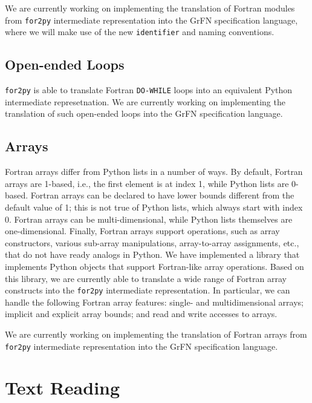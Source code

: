 \documentclass[article, 12pt, oneside]{memoir}
\begin{document}
We are currently working on implementing the translation of Fortran
modules from \texttt{for2py} intermediate representation into the GrFN
specification language, where we will make use of the new
\texttt{identifier} and naming conventions.

\hypertarget{open-ended-loops}{%
\subsection{Open-ended Loops}\label{open-ended-loops}}

\texttt{for2py} is able to translate Fortran \texttt{DO-WHILE} loops
into an equivalent Python intermediate represetnation. We are currently
working on implementing the translation of such open-ended loops into
the GrFN specification language.

\hypertarget{arrays}{%
\subsection{Arrays}\label{arrays}}

Fortran arrays differ from Python lists in a number of ways. By default,
Fortran arrays are 1-based, i.e., the first element is at index 1, while
Python lists are 0-based. Fortran arrays can be declared to have lower
bounds different from the default value of 1; this is not true of Python
lists, which always start with index 0. Fortran arrays can be
multi-dimensional, while Python lists themselves are one-dimensional.
Finally, Fortran arrays support operations, such as array constructors,
various sub-array manipulations, array-to-array assignments, etc., that
do not have ready analogs in Python. We have implemented a library that
implements Python objects that support Fortran-like array operations.
Based on this library, we are currently able to translate a wide range
of Fortran array constructs into the \texttt{for2py} intermediate
representation. In particular, we can handle the following Fortran array
features: single- and multidimensional arrays; implicit and explicit
array bounds; and read and write accesses to arrays.

We are currently working on implementing the translation of Fortran
arrays from \texttt{for2py} intermediate representation into the GrFN
specification language.


\hypertarget{text-reading}{%
\section{Text Reading}\label{text-reading}}
\end{document}
